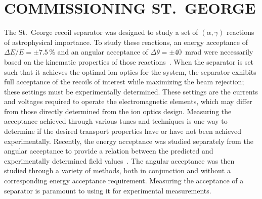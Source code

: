 
\chapter{COMMISSIONING ST.\ GEORGE}
\label{ch:commissioning}

The St.\ George recoil separator was designed to study a set of
$(\alpha,\gamma)$ reactions of astrophysical importance. To study these
reactions, an energy acceptance of $\Delta E/E = \pm7.5$\,\% and an
angular acceptance of $\Delta\theta = \pm40$~mrad were necessarily based
on the kinematic properties of those reactions~\cite{Couder2008}. When
the separator is set such that it achieves the optimal ion optics for
the system, the separator exhibits full acceptance of the recoils of
interest while maximizing the beam rejection; these settings must be
experimentally determined. These settings are the currents and voltages
required to operate the electromagnetic elements, which may differ from
those directly determined from the ion optics design. Measuring the
acceptance achieved through various tunes and techniques is one way to
determine if the desired transport properties have or have not been
achieved experimentally. Recently, the energy acceptance was studied
separately from the angular acceptance to provide a relation between the
predicted and experimentally determined field values~\cite{Meisel2017}.
The angular acceptance was then studied through a variety of methods,
both in conjunction and without a corresponding energy acceptance
requirement. Measuring the acceptance of a separator is paramount to
using it for experimental measurements.

